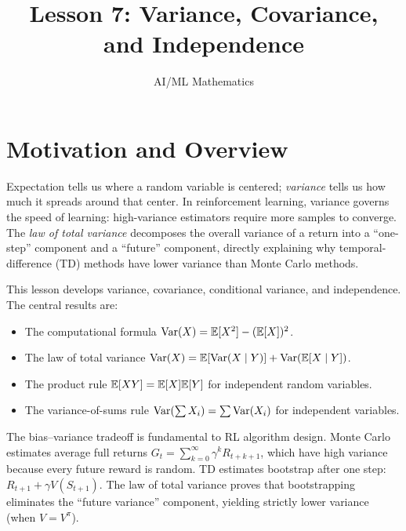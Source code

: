 \documentclass[11pt,a4paper]{article}
\title{Lesson 7: Variance, Covariance, and Independence}
\author{AI/ML Mathematics}
\date{}
\begin{document}
\maketitle
\tableofcontents
\newpage


\section{Motivation and Overview}
\label{sec:motivation}

Expectation tells us where a random variable is centered;
\emph{variance} tells us how much it spreads around that center.
In reinforcement learning, variance governs the speed of
learning: high-variance estimators require more samples to
converge.  The \emph{law of total variance} decomposes the
overall variance of a return into a ``one-step'' component and a
``future'' component, directly explaining why temporal-difference
(TD) methods have lower variance than Monte Carlo methods.

This lesson develops variance, covariance, conditional variance,
and independence.  The central results are:
\begin{itemize}[nosep]
  \item The computational formula
    $\operatorname{Var}(X) = \mathbb{E}[X^2] - (\mathbb{E}[X])^2$.
  \item The law of total variance
    $\operatorname{Var}(X) = \mathbb{E}[\operatorname{Var}(X \mid Y)] + \operatorname{Var}(\mathbb{E}[X \mid Y])$.
  \item The product rule $\mathbb{E}[XY] = \mathbb{E}[X]\mathbb{E}[Y]$ for independent
    random variables.
  \item The variance-of-sums rule
    $\operatorname{Var}(\sum X_i) = \sum \operatorname{Var}(X_i)$ for independent variables.
\end{itemize}

\begin{rlconnection}[title={Why This Matters for RL}]
The bias--variance tradeoff is fundamental to RL algorithm
design.  Monte Carlo estimates average full returns
$G_t = \sum_{k=0}^\infty \gamma^k R_{t+k+1}$, which have high
variance because every future reward is random.  TD estimates
bootstrap after one step: $R_{t+1} + \gamma V(S_{t+1})$.  The
law of total variance proves that bootstrapping eliminates the
``future variance'' component, yielding strictly lower variance
(when $V = V^\pi$).
\end{rlconnection}
\end{document}
